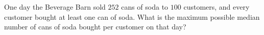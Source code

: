 One day the Beverage Barn sold $252$ cans of soda to $100$ customers, and every customer bought at least one can of soda. What is the maximum possible median number of cans of soda bought per customer on that day?
